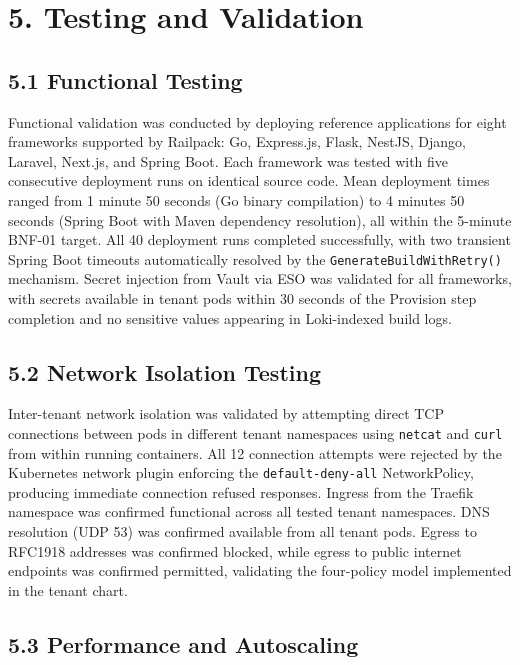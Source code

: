 \section*{5. Testing and Validation}

\subsection*{5.1 Functional Testing}

Functional validation was conducted by deploying reference applications for eight frameworks supported by Railpack: Go, Express.js, Flask, NestJS, Django, Laravel, Next.js, and Spring Boot. Each framework was tested with five consecutive deployment runs on identical source code. Mean deployment times ranged from 1 minute 50 seconds (Go binary compilation) to 4 minutes 50 seconds (Spring Boot with Maven dependency resolution), all within the 5-minute BNF-01 target. All 40 deployment runs completed successfully, with two transient Spring Boot timeouts automatically resolved by the \texttt{GenerateBuildWithRetry()} mechanism. Secret injection from Vault via ESO was validated for all frameworks, with secrets available in tenant pods within 30 seconds of the Provision step completion and no sensitive values appearing in Loki-indexed build logs.

\subsection*{5.2 Network Isolation Testing}

Inter-tenant network isolation was validated by attempting direct TCP connections between pods in different tenant namespaces using \texttt{netcat} and \texttt{curl} from within running containers. All 12 connection attempts were rejected by the Kubernetes network plugin enforcing the \texttt{default-deny-all} NetworkPolicy, producing immediate connection refused responses. Ingress from the Traefik namespace was confirmed functional across all tested tenant namespaces. DNS resolution (UDP 53) was confirmed available from all tenant pods. Egress to RFC1918 addresses was confirmed blocked, while egress to public internet endpoints was confirmed permitted, validating the four-policy model implemented in the tenant chart.

\subsection*{5.3 Performance and Autoscaling}

